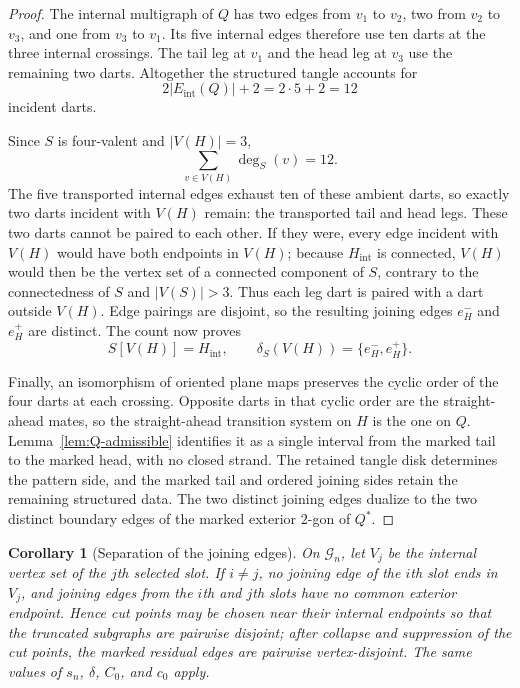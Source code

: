 \documentclass[9pt,twoside]{pnas-new}
\newtheorem{corollary}[theorem]{Corollary}
\theoremstyle{definition}
\theoremstyle{remark}
\begin{document}
\begin{proof}
The internal multigraph of $Q$ has two edges from $v_1$ to $v_2$, two from $v_2$ to $v_3$, and one from $v_3$ to $v_1$. Its five internal edges therefore use ten darts at the three internal crossings. The tail leg at $v_1$ and the head leg at $v_3$ use the remaining two darts. Altogether the structured tangle accounts for
\[
 2\lvert E_{\mathrm{int}}(Q)\rvert+2=2\cdot5+2=12
\]
incident darts.

Since $S$ is four-valent and $\lvert V(H)\rvert=3$,
\[
 \sum_{v\in V(H)}\deg_S(v)=12.
\]
The five transported internal edges exhaust ten of these ambient darts, so exactly two darts incident with $V(H)$ remain: the transported tail and head legs. These two darts cannot be paired to each other. If they were, every edge incident with $V(H)$ would have both endpoints in $V(H)$; because $H_{\mathrm{int}}$ is connected, $V(H)$ would then be the vertex set of a connected component of $S$, contrary to the connectedness of $S$ and $\lvert V(S)\rvert>3$. Thus each leg dart is paired with a dart outside $V(H)$. Edge pairings are disjoint, so the resulting joining edges $e_H^-$ and $e_H^+$ are distinct. The count now proves
\[
 S[V(H)]=H_{\mathrm{int}},
 \qquad
 \delta_S(V(H))=\{e_H^-,e_H^+\}.
\]

Finally, an isomorphism of oriented plane maps preserves the cyclic order of the four darts at each crossing. Opposite darts in that cyclic order are the straight-ahead mates, so the straight-ahead transition system on $H$ is the one on $Q$. Lemma~\ref{lem:Q-admissible} identifies it as a single interval from the marked tail to the marked head, with no closed strand. The retained tangle disk determines the pattern side, and the marked tail and ordered joining sides retain the remaining structured data. The two distinct joining edges dualize to the two distinct boundary edges of the marked exterior $2$-gon of $Q^*$.
\end{proof}

\begin{corollary}[Separation of the joining edges]
\label{cor:distance-three-buffer}
On $\mathcal G_n$, let $V_j$ be the internal vertex set of the $j$th selected slot. If $i\ne j$, no joining edge of the $i$th slot ends in $V_j$, and joining edges from the $i$th and $j$th slots have no common exterior endpoint. Hence cut points may be chosen near their internal endpoints so that the truncated subgraphs are pairwise disjoint; after collapse and suppression of the cut points, the marked residual edges are pairwise vertex-disjoint. The same values of $s_n$, $\delta$, $C_0$, and $c_0$ apply.
\end{corollary}
\end{document}
